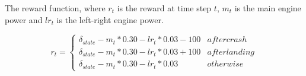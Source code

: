 The reward function, where $r_t$ is the reward at time step $t$, $m_t$ is the main engine power and $lr_t$ is the left-right engine power.

\begin{equation}
\label{eq:lunarreward}
    r_t =
    \begin{cases*}
      \delta _{state} - m_t*0.30 - lr_t*0.03 -100  & after crash \\
      \delta _{state} - m_t*0.30 - lr_t*0.03 +100 & after landing \\
      \delta _{state} - m_t*0.30 - lr_t*0.03  & otherwise 
    \end{cases*}
\end{equation}

